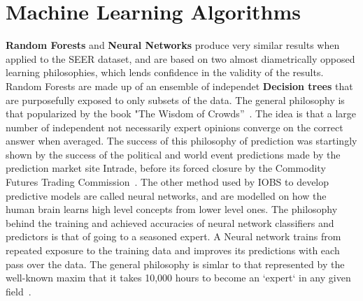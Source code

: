 \documentclass[a4paper,11pt]{article}
\begin{document}
\section{Machine Learning Algorithms}


\textbf{Random Forests} and \textbf{Neural Networks}
produce very similar results when applied to the SEER dataset, and are based on two almost diametrically opposed learning philosophies, which lends confidence in the validity of the results. 
Random Forests are made up of an ensemble of independet \textbf{Decision trees} that are purposefully exposed to only subsets of the data. The general philosophy is that popularized by the book "The Wisdom of Crowds''~\cite{wisdom}.
The idea is that a large number of independent not necessarily expert opinions converge on the correct answer when averaged. The success of this philosophy of prediction was startingly shown by the success of the political and world event predictions made by the prediction market site Intrade, before its forced closure by the Commodity Futures Trading Commission~\cite{cassidy}. %
 The other method used by IOBS to develop predictive models are called neural networks, and are modelled on how the human brain learns high level concepts from lower level ones. The philosophy behind the training and achieved accuracies of neural network classifiers and predictors is that of going to a seasoned expert. A Neural network trains from repeated exposure to the training data and improves its predictions with each pass over the data. The general philosophy is simlar to that represented by the well-known maxim that it takes 10,000 hours to become an `expert` in any given field~\cite{outliers}.
\end{document}
